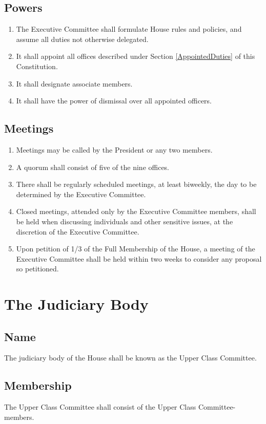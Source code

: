 \documentclass[10pt]{article} %
\begin{document}
\subsection{Powers}
\begin{enumerate}
\item The Executive Committee shall formulate House rules and policies, and assume all duties not otherwise delegated.
\item It shall appoint all offices described under Section \ref{AppointedDuties} of this Constitution.
\item It shall designate associate members.
\item It shall have the power of dismissal over all appointed officers.
\end{enumerate}
\subsection{Meetings}
\begin{enumerate}
\item Meetings may be called by the President or any two members.
\item A quorum shall consist of five of the nine offices.
\item There shall be regularly scheduled meetings, at least biweekly, the day to be determined by the Executive Committee.
\item Closed meetings, attended only by the Executive Committee members, shall be held when discussing individuals and other sensitive issues, at the discretion of the Executive Committee.
\item Upon petition of 1/3 of the Full Membership of the House, a meeting of the Executive Committee shall be held within two weeks to consider any proposal so petitioned.
\end{enumerate}
\section{The Judiciary Body}
\subsection{Name}
The judiciary body of the House shall be known as the Upper Class Committee.
\subsection{Membership}
The Upper Class Committee shall consist of the Upper Class Committee-members.
\end{document}
